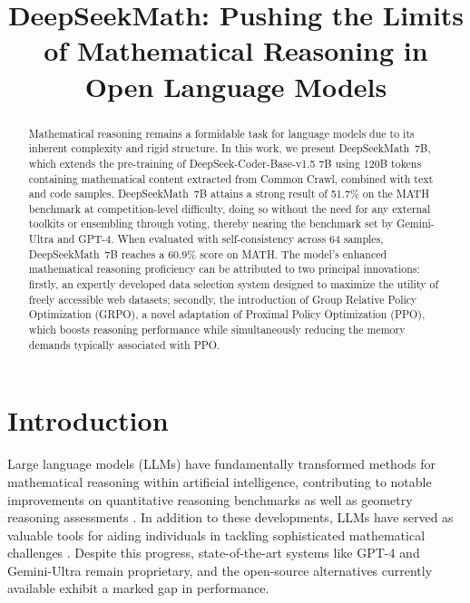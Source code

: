 \title{DeepSeekMath: Pushing the Limits of Mathematical Reasoning in Open Language Models}

\begin{abstract}
Mathematical reasoning remains a formidable task for language models due to its inherent complexity and rigid structure. In this work, we present DeepSeekMath~7B, which extends the pre-training of DeepSeek-Coder-Base-v1.5 7B using 120B tokens containing mathematical content extracted from Common Crawl, combined with text and code samples. DeepSeekMath~7B attains a strong result of 51.7\% on the MATH benchmark at competition-level difficulty, doing so without the need for any external toolkits or ensembling through voting, thereby nearing the benchmark set by Gemini-Ultra and GPT-4. When evaluated with self-consistency across 64 samples, DeepSeekMath~7B reaches a 60.9\% score on MATH. The model's enhanced mathematical reasoning proficiency can be attributed to two principal innovations: firstly, an expertly developed data selection system designed to maximize the utility of freely accessible web datasets; secondly, the introduction of Group Relative Policy Optimization (GRPO), a novel adaptation of Proximal Policy Optimization (PPO), which boosts reasoning performance while simultaneously reducing the memory demands typically associated with PPO.
\end{abstract}

\section{Introduction}

Large language models (LLMs) have fundamentally transformed methods for mathematical reasoning within artificial intelligence, contributing to notable improvements on quantitative reasoning benchmarks \citep{MATH} as well as geometry reasoning assessments \citep{trinh2024solving}. In addition to these developments, LLMs have served as valuable tools for aiding individuals in tackling sophisticated mathematical challenges \citep{tao}. Despite this progress, state-of-the-art systems like GPT-4 \citep{gpt4} and Gemini-Ultra \citep{gemini} remain proprietary, and the open-source alternatives currently available exhibit a marked gap in performance.

